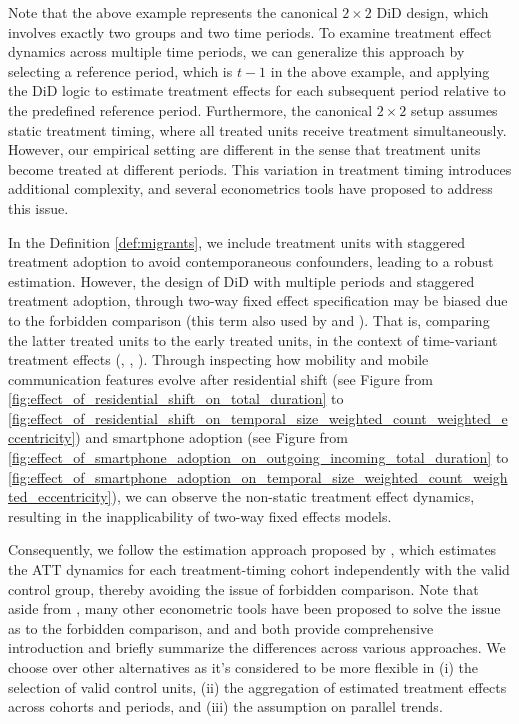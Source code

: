 Note that the above example represents the canonical \( 2 \times 2 \) DiD design, which involves exactly two groups and two time periods.
To examine treatment effect dynamics across multiple time periods, we can generalize this approach by selecting a reference period, which is \( t-1 \) in the above example, and applying the DiD logic to estimate treatment effects for each subsequent period relative to the predefined reference period.
Furthermore, the canonical \( 2 \times 2 \) setup assumes static treatment timing, where all treated units receive treatment simultaneously. However, our empirical setting are different in the sense that treatment units become treated at different periods. This variation in treatment timing introduces additional complexity, and several econometrics tools have proposed to address this issue.


In the Definition \ref{def:migrants}, we include treatment units with staggered treatment adoption to avoid contemporaneous confounders, leading to a robust estimation.
However, the design of DiD with multiple periods and staggered treatment adoption, through two-way fixed effect specification may be biased due to the forbidden comparison (this term also used by \cite{roth2023s} and \cite{de2023two}). That is, comparing the latter treated units to the early treated units, in the context of time-variant treatment effects (\cite{goodman2021difference}, \cite{sun2021estimating}, \cite{baker2022much}).
Through inspecting how mobility and mobile communication features evolve after residential shift (see Figure from \ref{fig:effect_of_residential_shift_on_total_duration} to \ref{fig:effect_of_residential_shift_on_temporal_size_weighted_count_weighted_eccentricity}) and smartphone adoption (see Figure from \ref{fig:effect_of_smartphone_adoption_on_outgoing_incoming_total_duration} to \ref{fig:effect_of_smartphone_adoption_on_temporal_size_weighted_count_weighted_eccentricity}), we can observe the non-static treatment effect dynamics, resulting in the inapplicability of two-way fixed effects models.

Consequently, we follow the estimation approach proposed by \cite{callaway2021difference}, which estimates the ATT dynamics for each treatment-timing cohort independently with the valid control group, thereby avoiding the issue of forbidden comparison.
Note that aside from \cite{callaway2021difference}, many other econometric tools have been proposed to solve the issue as to the forbidden comparison, and \cite{roth2023s} and \cite{de2023two} both provide comprehensive introduction and briefly summarize the differences across various approaches.
We choose \cite{callaway2021difference} over other alternatives as it's considered to be more flexible in (i) the selection of valid control units, (ii) the aggregation of estimated treatment effects across cohorts and periods, and (iii) the assumption on parallel trends.

